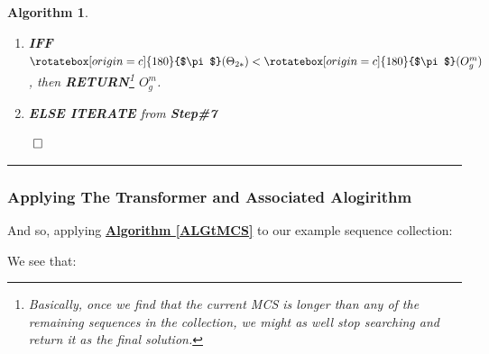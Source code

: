 \documentclass[a4paper, 18pt]{book} %
\newtheorem{alg}{Algorithm}
\newcommand{\invpi}{\rotatebox[origin=c]{180}{$\pi$}}
\begin{document}
\begin{alg}
\begin{enumerate}
{\begin{itemize}
\end{itemize}

}
\item \textbf{IFF} $\invpi(\Theta_{2*}) <  \invpi(O^m_g)$, then \textbf{RETURN}\footnote{Basically, once we find that the current MCS is longer than any of the remaining sequences in the collection, we might as well stop searching and return it as the final solution.}  $O^m_g$.
\item \textbf{ELSE ITERATE}  from \textbf{Step\#7}
\end{enumerate}


$\qed$
\end{alg}
\vspace{2em}

\noindent\rule{\textwidth}{0.4pt}

\vspace{2em}

\subsubsection{Applying The Transformer and Associated Alogirithm}
\label{SECAPPLYTRANSALG}

And so, applying \textbf{\hyperref[ALGtMCS]{Algorithm \ref{ALGtMCS}}} to our example sequence collection:

We see that:
\end{document}

